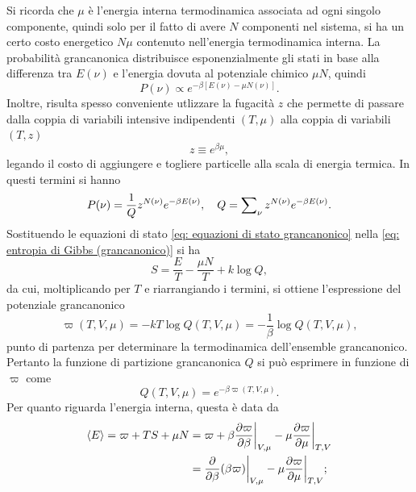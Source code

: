 Si ricorda che $\mu$ è l'energia interna termodinamica associata ad ogni singolo componente, quindi solo per il fatto di avere $N$ componenti nel sistema, si ha un certo costo energetico $N\mu$ contenuto nell'energia termodinamica interna. La probabilità grancanonica distribuisce esponenzialmente gli stati in base alla differenza tra $E(\nu)$ e l'energia dovuta al potenziale chimico $\mu N$, quindi
\begin{equation}
    P(\nu) \propto e^{-\beta[E(\nu) - \mu N(\nu)]}.
\end{equation}
Inoltre, risulta spesso conveniente utlizzare la fugacità $z$ che permette di passare dalla coppia di variabili intensive indipendenti $(T,\mu)$ alla coppia di variabili $(T,z)$ 
\begin{equation}
    z \equiv e^{\beta\mu},
\end{equation}
legando il costo di aggiungere e togliere particelle alla scala di energia termica. In questi termini si hanno
\begin{equation}
    P(\nu) = \frac{1}{Q}z^{N(\nu)}e^{-\beta E(\nu)},\quad Q = \sum\nolimits_\nu z^{N(\nu)}e^{-\beta E(\nu)}.
\end{equation}
Sostituendo le equazioni di stato \eqref{eq: equazioni di stato grancanonico} nella \eqref{eq: entropia di Gibbs (grancanonico)} si ha
\begin{equation}
    S = \frac{E}{T} - \frac{\mu N}{T} + k\log{Q},
\end{equation}
da cui, moltiplicando per $T$ e riarrangiando i termini, si ottiene l'espressione del potenziale grancanonico 
\begin{equation}
    \varpi(T,V,\mu) = -kT\log{Q(T,V,\mu)} = - \frac{1}{\beta} \log{Q(T,V,\mu)},
\end{equation}
punto di partenza per determinare la termodinamica dell'ensemble grancanonico. Pertanto la funzione di partizione grancanonica $Q$ si può esprimere in funzione di $\varpi$ come
\begin{equation}
    Q(T,V,\mu) = e^{-\beta\varpi(T,V,\mu)}.
\end{equation}
Per quanto riguarda l'energia interna, questa è data da
\begin{equation}
    \begin{split}
        \langle E \rangle = \varpi + TS +\mu N &= \varpi + \beta\frac{\partial\varpi}{\partial\beta}\bigg|_{V,\mu} - \mu\frac{\partial\varpi}{\partial\mu}\bigg|_{T,V} \\
        &= \frac{\partial}{\partial\beta}(\beta\varpi)\bigg|_{V,\mu} - \mu\frac{\partial\varpi}{\partial\mu}\bigg|_{T,V};
    \end{split}
\end{equation}
